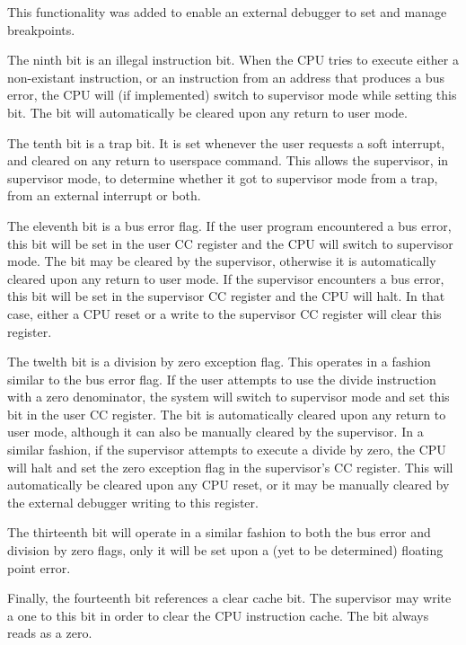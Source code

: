\documentclass{gqtekspec}
\begin{document}
%

This functionality was added to enable an external debugger to
	set and manage breakpoints.

The ninth bit is an illegal instruction bit.  When the CPU
tries to execute either a non-existant instruction, or an instruction from
an address that produces a bus error, the CPU will (if implemented) switch
to supervisor mode while setting this bit.  The bit will automatically be
cleared upon any return to user mode.

The tenth bit is a trap bit.  It is set whenever the user requests a soft
interrupt, and cleared on any return to userspace command.  This allows the
supervisor, in supervisor mode, to determine whether it got to supervisor
mode from a trap, from an external interrupt or both.

The eleventh bit is a bus error flag.  If the user program encountered a bus
error, this bit will be set in the user CC register and the CPU will switch to
supervisor mode.  The bit may be cleared by the supervisor, otherwise it is
automatically cleared upon any return to user mode.  If the supervisor
encounters a bus error, this bit will be set in the supervisor CC register
and the CPU will halt.  In that case, either a CPU reset or a write to the
supervisor CC register will clear this register.

The twelth bit is a division by zero exception flag.  This operates in a fashion
similar to the bus error flag.  If the user attempts to use the divide
instruction with a zero denominator, the system will switch to supervisor mode
and set this bit in the user CC register.  The bit is automatically cleared
upon any return to user mode, although it can also be manually cleared by
the supervisor.  In a similar fashion, if the supervisor attempts to execute
a divide by zero, the CPU will halt and set the zero exception flag in the
supervisor's CC register.  This will automatically be cleared upon any CPU
reset, or it may be manually cleared by the external debugger writing to this
register.

The thirteenth bit will operate in a similar fashion to both the bus error
and division by zero flags, only it will be set upon a (yet to be determined)
floating point error.

Finally, the fourteenth bit references a clear cache bit.  The supervisor may
write a one to this bit in order to clear the CPU instruction cache.  The
bit always reads as a zero.
\end{document}
